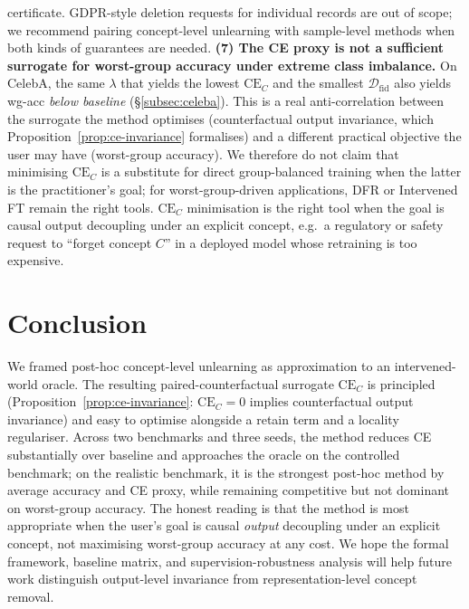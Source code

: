 \documentclass{article}
\newcommand{\CE}{\mathrm{CE}}
\newcommand{\Dfid}{\mathcal{D}_{\mathrm{fid}}}
\begin{document}
certificate.  GDPR-style deletion requests for individual records are out of
scope; we recommend pairing concept-level unlearning with sample-level
methods when both kinds of guarantees are needed.
\textbf{(7) The CE proxy is not a sufficient surrogate for worst-group
accuracy under extreme class imbalance.}  On CelebA, the same $\lambda$ that
yields the lowest $\CE_C$ and the smallest $\Dfid$ also yields wg-acc
\emph{below baseline} (\S\ref{subsec:celeba}).  This is a real anti-correlation
between the surrogate the method optimises (counterfactual output invariance,
which Proposition~\ref{prop:ce-invariance} formalises) and a different practical
objective the user may have (worst-group accuracy).  We therefore do not claim
that minimising $\CE_C$ is a substitute for direct group-balanced training when
the latter is the practitioner's goal; for worst-group-driven applications,
DFR or Intervened FT remain the right tools.  $\CE_C$ minimisation is the
right tool when the goal is causal output decoupling under an explicit
concept, e.g.\ a regulatory or safety request to ``forget concept $C$'' in
a deployed model whose retraining is too expensive.

\section{Conclusion}
\label{sec:conclusion}

We framed post-hoc concept-level unlearning as approximation to an
intervened-world oracle.  The resulting paired-counterfactual surrogate
$\CE_C$ is principled (Proposition~\ref{prop:ce-invariance}: $\CE_C{=}0$
implies counterfactual output invariance) and easy to optimise alongside a
retain term and a locality regulariser.  Across two benchmarks and three
seeds, the method reduces CE substantially over baseline and approaches the
oracle on the controlled benchmark; on the realistic benchmark, it is the
strongest post-hoc method by average accuracy and CE proxy, while remaining
competitive but not dominant on worst-group accuracy.  The honest reading is
that the method is most appropriate when the user's goal is causal
\emph{output} decoupling under an explicit concept, not maximising
worst-group accuracy at any cost.  We hope the formal framework, baseline
matrix, and supervision-robustness analysis will help future work distinguish
output-level invariance from representation-level concept removal.
\end{document}
